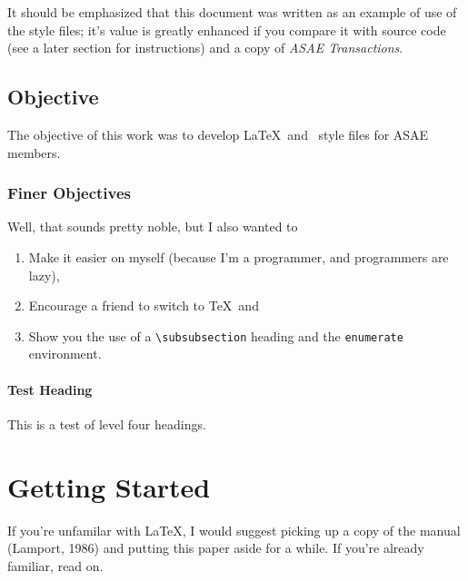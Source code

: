 It should be emphasized that this document was written as an example
of use of the style files; it's value is greatly enhanced if you
compare it with source code (see a later section for instructions) and
a copy of {\em ASAE Transactions}.

\subsection{Objective}

The objective of this work was to develop \LaTeX\ and \BibTeX\
style files for ASAE members.

\subsubsection{Finer Objectives}
Well, that sounds pretty noble, but I also wanted to
\begin{enumerate}
\item Make it easier on myself (because I'm a programmer, and programmers
are lazy),
\item Encourage a friend to switch to \TeX\, and
\item Show you the use of a  \verb#\subsubsection# heading and the 
{\tt enumerate} environment.
\end{enumerate}

\paragraph{Test Heading} 
This is a test of level four headings.

\section{Getting Started}

If you're unfamilar with \LaTeX, I would suggest picking up a copy of
the manual (Lamport, 1986) \cite[note]{ll:86} and putting this paper
aside for a while. If you're already familiar, read on.

